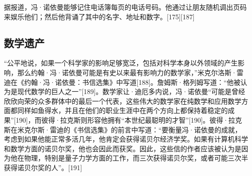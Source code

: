 据报道，冯·诺依曼能够记住电话簿每页的电话号码。他通过让朋友随机调出页码来娱乐他们；然后他背诵了其中的名字、地址和数字。[175][187]

\subsection{数学遗产}
“公平地说，如果一个科学家的影响足够宽泛，包括对科学本身以外领域的产生影响，那么约翰·冯·诺依曼可能是有史以来最有影响力的数学家，”米克尔洛斯·雷迪在《约翰·冯·诺依曼：书信选集》中写道[188]。詹姆斯·格列姆写道：“他被认为是现代数学的巨人之一”[189]。数学家让·迪厄多内说，冯·诺依曼“可能是曾经欣欣向荣的众多群体中的最后一个代表，这些伟大的数学家在纯数学和应用数学方面都同样如鱼得水，并且在他们的职业生涯中在两个方向上都保持着稳定的成果”[190]，而彼得·拉克斯则形容他拥有“本世纪最聪明的才智”[190]。彼得·拉克斯在米克尔斯·雷迪的《书信选集》的前言中写道：“要衡量冯·诺依曼的成就，考虑到如果他能正常多活几年，他肯定会获得诺贝尔经济学奖。如果有计算机科学和数学方面的诺贝尔奖，他也会因此而获奖。因此，这些信的作者应该被认为是因为他在物理，特别是量子力学方面的工作，而三次获得诺贝尔奖，或者可能三次半获得诺贝尔奖的人”。[191]